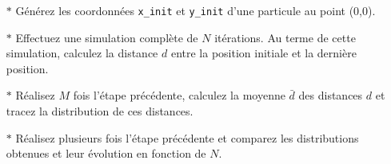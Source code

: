 \begin{enumerate}
\begin{itemize}
  \item[$\ast$] Générez les coordonnées \texttt{x\_init} et \texttt{y\_init}
    d'une particule au point (0,0).
  \item[$\ast$]  Effectuez une simulation complète  de $N$ itérations. Au terme
    de cette  simulation, calculez la  distance $d$ entre  la position
    initiale et la dernière position.
  \item[$\ast$]   Réalisez $M$  fois  l'étape précédente,  calculez la  moyenne
    $\bar{d}$  des distances  $d$  et tracez  la  distribution de  ces
    distances.
  \item[$\ast$]   Réalisez plusieurs  fois l'étape  précédente et  comparez les
    distributions obtenues et leur évolution en fonction de $N$.
  \end{itemize}


\end{enumerate}


